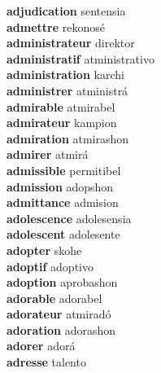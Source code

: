 \textbf{adjudication } sentensia \\
\textbf{admettre } rekonosé \\
\textbf{administrateur } direktor \\
\textbf{administratif } atministrativo \\
\textbf{administration } karchi \\
\textbf{administrer } atministrá \\
\textbf{admirable } atmirabel \\
\textbf{admirateur } kampion \\
\textbf{admiration } atmirashon \\
\textbf{admirer } atmirá \\
\textbf{admissible } permitibel \\
\textbf{admission } adopshon \\
\textbf{admittance } admision \\
\textbf{adolescence } adolesensia \\
\textbf{adolescent } adolesente \\
\textbf{adopter } skohe \\
\textbf{adoptif } adoptivo \\
\textbf{adoption } aprobashon \\
\textbf{adorable } adorabel \\
\textbf{adorateur } atmiradó \\
\textbf{adoration } adorashon \\
\textbf{adorer } adorá \\
\textbf{adresse } talento \\
